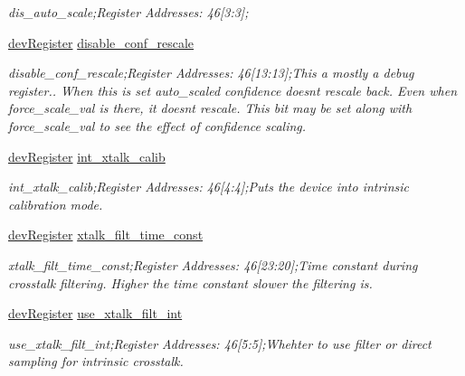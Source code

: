 \begin{DoxyCompactItemize}
\begin{DoxyCompactList}\small\item\em dis\+\_\+auto\+\_\+scale;Register Addresses\+: 46\mbox{[}3\+:3\mbox{]}; \end{DoxyCompactList}\item 
\mbox{\hyperlink{classdev_register}{dev\+Register}} \mbox{\hyperlink{class_o_p_t3101_registers_a73a7ffc9accc55fceffd43472580d9d2}{disable\+\_\+conf\+\_\+rescale}}
\begin{DoxyCompactList}\small\item\em disable\+\_\+conf\+\_\+rescale;Register Addresses\+: 46\mbox{[}13\+:13\mbox{]};This a mostly a debug register.. When this is set auto\+\_\+scaled confidence doesn\textquotesingle{}t rescale back. Even when force\+\_\+scale\+\_\+val is there, it doesn\textquotesingle{}t rescale. This bit may be set along with force\+\_\+scale\+\_\+val to see the effect of confidence scaling. \end{DoxyCompactList}\item 
\mbox{\hyperlink{classdev_register}{dev\+Register}} \mbox{\hyperlink{class_o_p_t3101_registers_a3b6ac9de3bd76e59cecdf40d5d29d452}{int\+\_\+xtalk\+\_\+calib}}
\begin{DoxyCompactList}\small\item\em int\+\_\+xtalk\+\_\+calib;Register Addresses\+: 46\mbox{[}4\+:4\mbox{]};Puts the device into intrinsic calibration mode. \end{DoxyCompactList}\item 
\mbox{\hyperlink{classdev_register}{dev\+Register}} \mbox{\hyperlink{class_o_p_t3101_registers_a998237de51882bdbb1c5192045ed76de}{xtalk\+\_\+filt\+\_\+time\+\_\+const}}
\begin{DoxyCompactList}\small\item\em xtalk\+\_\+filt\+\_\+time\+\_\+const;Register Addresses\+: 46\mbox{[}23\+:20\mbox{]};Time constant during crosstalk filtering. Higher the time constant slower the filtering is. \end{DoxyCompactList}\item 
\mbox{\hyperlink{classdev_register}{dev\+Register}} \mbox{\hyperlink{class_o_p_t3101_registers_a6b0e2c72ef5fc4113d7226786b644a97}{use\+\_\+xtalk\+\_\+filt\+\_\+int}}
\begin{DoxyCompactList}\small\item\em use\+\_\+xtalk\+\_\+filt\+\_\+int;Register Addresses\+: 46\mbox{[}5\+:5\mbox{]};Whehter to use filter or direct sampling for intrinsic crosstalk. \end{DoxyCompactList}\item 

\end{DoxyCompactItemize}
